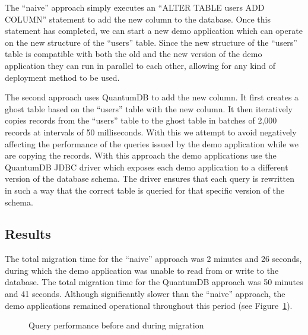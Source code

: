 \documentclass[conference]{IEEEtran}
\begin{document}
The ``naive'' approach simply executes an ``ALTER TABLE users ADD COLUMN'' statement to add the new column to the database. Once this statement has completed, we can start a new demo application which can operate on the new structure of the ``users'' table. Since the new structure of the ``users'' table is compatible with both the old and the new version of the demo application they can run in parallel to each other, allowing for any kind of deployment method to be used. 

The second approach uses QuantumDB to add the new column. It first creates a ghost table based on the ``users'' table with the new column. It then iteratively copies records from the ``users'' table to the ghost table in batches of 2,000 records at intervals of 50 milliseconds. With this we attempt to avoid negatively affecting the performance of the queries issued by the demo application while we are copying the records. With this approach the demo applications use the QuantumDB JDBC driver which exposes each demo application to a different version of the database schema. The driver ensures that each query is rewritten in such a way that the correct table is queried for that specific version of the schema.


\subsection{Results}
\label{sec:results}

The total migration time for the ``naive'' approach was 2 minutes and 26 seconds, during which the demo application was unable to read from or write to the database. The total migration time for the QuantumDB approach was 50 minutes and 41 seconds. Although significantly slower than the ``naive'' approach, the demo applications remained operational throughout this period (see Figure~\ref{fig:migration}).

\begin{figure}%
    \centering
    \qquad
    \caption{Query performance before and during migration}%
    \label{fig:migration}%
\end{figure}
\end{document}
